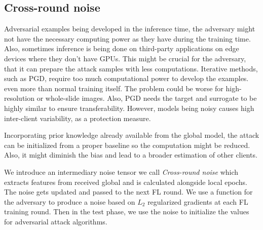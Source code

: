 \subsection{Cross-round noise}



Adversarial examples being developed in the inference time, the adversary might not have the necessary computing power as they have during the training time. Also, sometimes inference is being done on third-party applications on edge devices where they don't have GPUs.
This might be crucial for the adversary, that it can prepare the attack samples with less computations. Iterative methods, such as PGD, require too much computational power to develop the examples. even more than normal training itself. \cite{zhang2019you} The problem could be worse for high-resolution or whole-slide images.
Also, PGD needs the target and surrogate to be highly similar to ensure transferability. However, models being noisy causes high inter-client variability, as a protection measure.



Incorporating prior knowledge already available from the global model, the attack can be initialized from a proper baseline so the computation might be reduced. Also, it might diminish the bias and lead to a broader estimation of other clients.



We introduce an intermediary noise tensor we call \textit{Cross-round noise} which extracts features from received global and is calculated alongside local epochs. The noise gets updated and passed to the next FL round. 
We use a function for the adversary to produce a noise based on ${L}_{2}$ regularized gradients at each FL training round. Then in the test phase, we use the noise to initialize the values for adversarial attack algorithms. 



